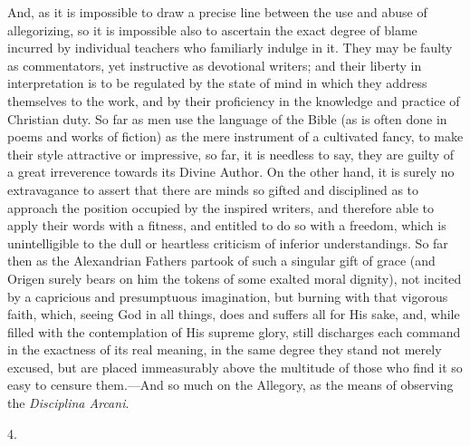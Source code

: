 And, as it is impossible to draw a precise line between the use and
abuse of allegorizing, so it is impossible also to ascertain the exact
degree of blame incurred by individual teachers who familiarly indulge
in it. They may be faulty as commentators, yet instructive as
devotional writers; and their liberty in interpretation is to be
regulated by the state of mind in which they address themselves to the
work, and by their proficiency in the knowledge and practice of
Christian duty. So far as men use the language of the Bible (as is
often done in poems and works of fiction) as the mere instrument of a
cultivated fancy, to make their style attractive or impressive, so
far, it is needless to say, they are guilty of a great irreverence
towards its Divine Author. On the other hand, it is surely no
extravagance to assert that there are minds so gifted and disciplined
as to approach the position occupied by the inspired writers, and
therefore able to apply their words with a fitness, and entitled to do
so with a freedom, which is unintelligible to the dull or heartless
criticism of inferior understandings. So far then as the Alexandrian
Fathers partook of such a singular gift of grace (and Origen surely
bears on him the tokens of some exalted moral dignity), not incited by
a capricious and presumptuous imagination, but burning with that
vigorous faith, which, seeing God in all things, does and suffers
all for His sake, and, while filled with the contemplation of His
supreme glory, still discharges each command in the exactness of its
real meaning, in the same degree they stand not merely excused, but
are placed immeasurably above the multitude of those who find it so
easy to censure them.—And so much on the Allegory, as the means of
observing the \emph{Disciplina Arcani}.

4.

